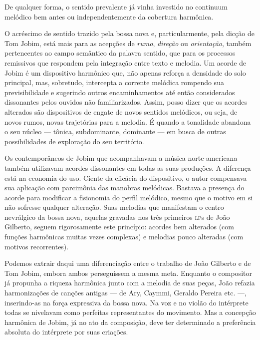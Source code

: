 De qualquer forma, o sentido prevalente já vinha investido no continuum
melódico bem antes ou independentemente da cobertura harmônica.

O acréscimo de sentido trazido pela bossa nova e, particularmente, pela
dicção de Tom Jobim, está mais para as acepções de \textit{rumo}, \textit{direção} ou
\textit{orientação}, também pertencentes ao campo semântico da palavra sentido,
que para os processos remissivos que respondem pela integração entre
texto e melodia. Um acorde de Jobim é um dispositivo harmônico que, não
apenas reforça a densidade do solo principal, mas, sobretudo, intercepta
a corrente melódica rompendo sua previsibilidade e sugerindo outros
encaminhamentos até então considerados dissonantes pelos ouvidos não
familiarizados. Assim, posso dizer que os acordes alterados são
dispositivos de engate de novos sentidos melódicos, ou seja, de novos
rumos, novas trajetórias para a melodia. É quando a tonalidade abandona
o seu núcleo --- tônica, subdominante, dominante --- em busca de outras
possibilidades de exploração do seu território.

Os contemporâneos de Jobim que acompanhavam a música norte-americana
também utilizavam acordes dissonantes em todas as suas produções. A
diferença está na economia do uso. Ciente da eficácia do dispositivo, o
autor compensava sua aplicação com parcimônia das manobras melódicas.
Bastava a presença do acorde para modificar a fisionomia do perfil
melódico, mesmo que o motivo em si não sofresse qualquer alteração. Suas
melodias que manifestam o centro nevrálgico da bossa nova, aquelas
gravadas nos três primeiros \textsc{lp}s de João Gilberto, seguem rigorosamente
este princípio: acordes bem alterados (com funções harmônicas muitas
vezes complexas) e melodias pouco alteradas (com motivos recorrentes).

Podemos extrair daqui uma diferenciação entre o trabalho de João
Gilberto e de Tom Jobim, embora ambos perseguissem a mesma meta.
Enquanto o compositor já propunha a riqueza harmônica junto com a
melodia de suas peças, João refazia harmonizações de canções antigas --- de Ary, Caymmi, Geraldo Pereira etc. ---, inserindo-as na força expressiva
da bossa nova. Na voz e no violão do intérprete todas se nivelavam como
perfeitas representantes do movimento. Mas a concepção harmônica de
Jobim, já no ato da composição, deve ter determinado a preferência
absoluta do intérprete por suas criações.

